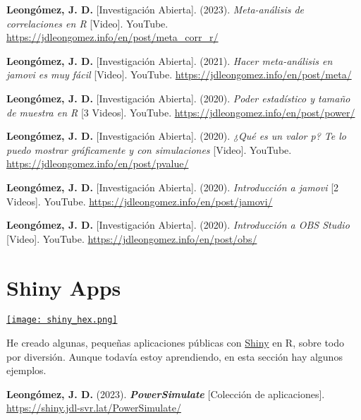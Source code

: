 \documentclass[11pt,a4paper,]{awesome-cv}
\begin{document}
\begingroup
\footnotesize
\setlength{\parindent}{-0.5in}
\setlength{\leftskip}{0.5in}

\textbf{Leongómez, J. D.} {[}Investigación Abierta{]}. (2023).
\emph{Meta-análisis de correlaciones en R} {[}Video{]}. YouTube.
\url{https://jdleongomez.info/en/post/meta_corr_r/}

\textbf{Leongómez, J. D.} {[}Investigación Abierta{]}. (2021).
\emph{Hacer meta-análisis en jamovi es muy fácil} {[}Video{]}. YouTube.
\url{https://jdleongomez.info/en/post/meta/}

\textbf{Leongómez, J. D.} {[}Investigación Abierta{]}. (2020).
\emph{Poder estadístico y tamaño de muestra en R} {[}3 Videos{]}.
YouTube. \url{https://jdleongomez.info/en/post/power/}

\textbf{Leongómez, J. D.} {[}Investigación Abierta{]}. (2020).
\emph{¿Qué es un valor p? Te lo puedo mostrar gráficamente y con
simulaciones} {[}Video{]}. YouTube.
\url{https://jdleongomez.info/en/post/pvalue/}

\textbf{Leongómez, J. D.} {[}Investigación Abierta{]}. (2020).
\emph{Introducción a jamovi} {[}2 Videos{]}. YouTube.
\url{https://jdleongomez.info/en/post/jamovi/}

\textbf{Leongómez, J. D.} {[}Investigación Abierta{]}. (2020).
\emph{Introducción a OBS Studio} {[}Video{]}. YouTube.
\url{https://jdleongomez.info/en/post/obs/}

\endgroup

\section{Shiny Apps}\label{shiny-apps}

\begin{minipage}[c]{0.10\linewidth}
\href{https://jdleongomez.info/es/#shiny}{\texttt{[image: shiny\_hex.png]}}
\end{minipage} \begin{minipage}[c]{0.90\linewidth}
He creado algunas, pequeñas aplicaciones públicas con \href{https://shiny.posit.co/}{Shiny} en R, sobre todo por diversión. Aunque todavía estoy aprendiendo, en esta sección hay algunos ejemplos.
\end{minipage}

\begingroup
\footnotesize
\setlength{\parindent}{-0.5in}
\setlength{\leftskip}{0.5in}

\textbf{Leongómez, J. D.} (2023). \textbf{\emph{PowerSimulate}}
{[}Colección de aplicaciones{]}.
\url{https://shiny.jdl-svr.lat/PowerSimulate/}
\end{document}
